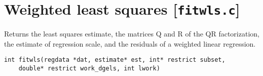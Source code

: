 \documentclass[a4paper,oneside,10pt,DIV=12]{scrartcl}
\begin{document}
\clearpage
\section{Weighted least squares [\texttt{fitwls.c}]}
\begin{Description}
	Returns the least squares estimate, the matrices Q and R of the QR
	factorization, the estimate of regression scale, and the residuals of
    a weighted linear regression.
\end{Description}
\begin{Usage}
\begin{verbatim}
int fitwls(regdata *dat, estimate* est, int* restrict subset,
    double* restrict work_dgels, int lwork)
\end{verbatim}
\end{Usage}
\end{document}
